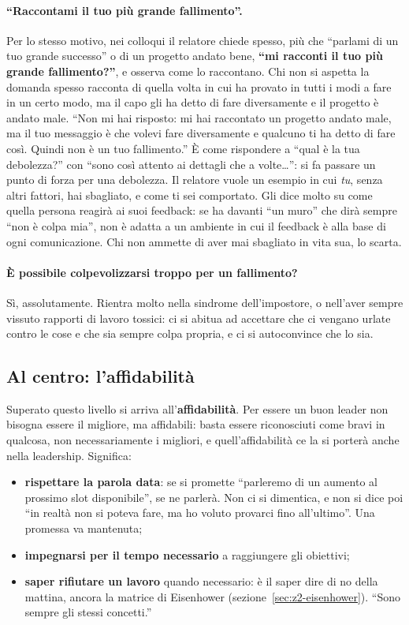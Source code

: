 \paragraph{``Raccontami il tuo più grande fallimento''.} Per lo stesso motivo, nei colloqui il
relatore chiede spesso, più che ``parlami di un tuo grande successo'' o di un progetto andato bene,
\textbf{``mi racconti il tuo più grande fallimento?''}, e osserva come lo raccontano. Chi non si
aspetta la domanda spesso racconta di quella volta in cui ha provato in tutti i modi a fare in un
certo modo, ma il capo gli ha detto di fare diversamente e il progetto è andato male. ``Non mi hai
risposto: mi hai raccontato un progetto andato male, ma il tuo messaggio è che volevi fare
diversamente e qualcuno ti ha detto di fare così. Quindi non è un tuo fallimento.'' È come
rispondere a ``qual è la tua debolezza?'' con ``sono così attento ai dettagli che a volte\dots'':
si fa passare un punto di forza per una debolezza. Il relatore vuole un esempio in cui \emph{tu},
senza altri fattori, hai sbagliato, e come ti sei comportato. Gli dice molto su come quella persona
reagirà ai suoi feedback: se ha davanti ``un muro'' che dirà sempre ``non è colpa mia'', non è adatta
a un ambiente in cui il feedback è alla base di ogni comunicazione. Chi non ammette di aver mai
sbagliato in vita sua, lo scarta.

\paragraph{È possibile colpevolizzarsi troppo per un fallimento?} Sì, assolutamente. Rientra molto
nella sindrome dell'impostore, o nell'aver sempre vissuto rapporti di lavoro tossici: ci si abitua ad
accettare che ci vengano urlate contro le cose e che sia sempre colpa propria, e ci si autoconvince
che lo sia.

\subsection{Al centro: l'affidabilità}

Superato questo livello si arriva all'\textbf{affidabilità}. Per essere un buon leader non bisogna
essere il migliore, ma affidabili: basta essere riconosciuti come bravi in qualcosa, non
necessariamente i migliori, e quell'affidabilità ce la si porterà anche nella leadership. Significa:
\begin{itemize}
  \item \textbf{rispettare la parola data}: se si promette ``parleremo di un aumento al prossimo
        slot disponibile'', se ne parlerà. Non ci si dimentica, e non si dice poi ``in realtà non si
        poteva fare, ma ho voluto provarci fino all'ultimo''. Una promessa va mantenuta;
  \item \textbf{impegnarsi per il tempo necessario} a raggiungere gli obiettivi;
  \item \textbf{saper rifiutare un lavoro} quando necessario: è il saper dire di no della mattina,
        ancora la matrice di Eisenhower (sezione~\ref{sec:z2-eisenhower}). ``Sono sempre gli
        stessi concetti.''
\end{itemize}

